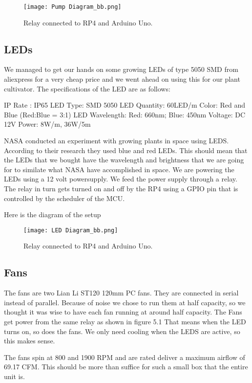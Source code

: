 \documentclass[a4paper,12pt,twoside,openright,titlepage]{book}
\begin{document}
\begin{figure}[h]
    \texttt{[image: Pump Diagram\_bb.png]}
    \caption{Relay connected to RP4 and Arduino Uno.}
    \label{LED_diagram}
\end{figure}

\subsection{LEDs}

We managed to get our hands on some growing LEDs of type 5050 SMD from aliexpress for a very cheap price and we went ahead on using this for our plant cultivator. The specifications of the LED are as follows:

IP Rate : IP65
LED Type: SMD 5050
LED Quantity: 60LED/m 
Color: Red and Blue (Red:Blue = 3:1)
LED Wavelength: Red: 660nm; Blue: 450nm
Voltage: DC 12V
Power: 8W/m, 36W/5m

NASA conducted an experiment \cite{nasa_led} with growing plants in space using LEDS. According to their research they used blue and red LEDs. This should mean that the LEDs that we bought have the wavelength and brightness that we are going for to similate what NASA have accomplished in space.
We are powering the LEDs using a 12 volt powersupply. We feed the power supply through a relay. The relay in turn gets turned on and off by the RP4 using a GPIO pin that is controlled by the scheduler of the MCU.

Here is the diagram of the setup

\begin{figure}[h]
    \texttt{[image: LED Diagram\_bb.png]}
    \caption{Relay connected to RP4 and Arduino Uno.}
    \label{LED_diagram}
\end{figure}

\subsection{Fans}

The fans are two Lian Li ST120 120mm PC fans. They are connected in serial instead of parallel. Because of noise we chose to run them at half capacity, so we thought it was wise to have each fan running at around half capacity.
The Fans get power from the same relay as shown in figure 5.1
That means when the LED turns on, so does the fans. We only need cooling when the LEDS are active, so this makes sense.

The fans spin at 800 and 1900 RPM and are rated deliver a maximum airflow of 69.17 CFM. This should be more than suffice for such a small box that the entire unit is.
\end{document}
